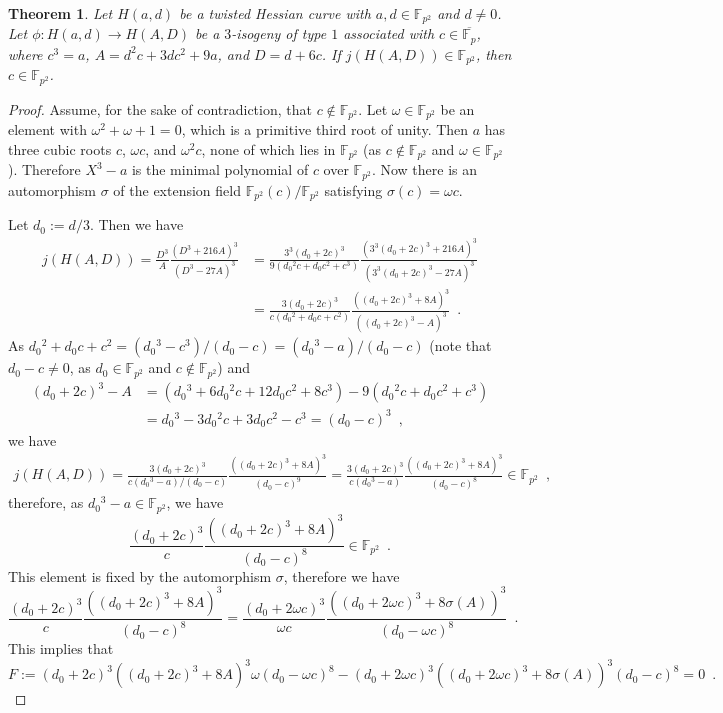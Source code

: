 \documentclass{article}
\newtheorem{theorem}{Theorem}[section]
\theoremstyle{definition}
\newcommand{\FF}{\mathbb{F}}
\begin{document}
\begin{theorem}
\label{thm:whether_codomain_is_over_Fp2}
Let $H(a,d)$ be a twisted Hessian curve with $a,d \in \FF_{p^2}$ and $d \neq 0$.
Let $\phi \colon H(a,d) \to H(A,D)$ be a $3$-isogeny of type $1$ associated with $c \in \overline{\FF_p}$, where $c^3 = a$, $A = d^2 c + 3 d c^2 + 9a$, and $D = d + 6c$.
If $j(H(A,D)) \in \FF_{p^2}$, then $c \in \FF_{p^2}$.
\end{theorem}
\begin{proof}
Assume, for the sake of contradiction, that $c \not\in \FF_{p^2}$.
Let $\omega \in \FF_{p^2}$ be an element with $\omega^2 + \omega + 1 = 0$, which is a primitive third root of unity.
Then $a$ has three cubic roots $c$, $\omega c$, and $\omega^2 c$, none of which lies in $\FF_{p^2}$ (as $c \not\in \FF_{p^2}$ and $\omega \in \FF_{p^2}$).
Therefore $X^3 - a$ is the minimal polynomial of $c$ over $\FF_{p^2}$.
Now there is an automorphism $\sigma$ of the extension field $\FF_{p^2}(c)/\FF_{p^2}$ satisfying $\sigma(c) = \omega c$.

Let $d_0 := d/3$.
Then we have
\[
\begin{split}
j(H(A,D))
= \frac{ D^3 }{ A } \frac{ (D^3 + 216A)^3 }{ (D^3 - 27A)^3 }
&= \frac{ 3^3 (d_0 + 2c)^3 }{ 9 (d_0{}^2 c + d_0 c^2 + c^3) } \frac{ ( 3^3 (d_0 + 2c)^3 + 216 A )^3 }{ ( 3^3 (d_0 + 2c)^3 - 27 A )^3 } \\
&= \frac{ 3 (d_0 + 2c)^3 }{ c (d_0{}^2 + d_0 c + c^2) } \frac{ ( (d_0 + 2c)^3 + 8 A )^3 }{ ( (d_0 + 2c)^3 - A )^3 } \enspace.
\end{split}
\]
As $d_0{}^2 + d_0 c + c^2 = (d_0{}^3 - c^3) / (d_0 - c) = (d_0{}^3 - a) / (d_0 - c)$ (note that $d_0 - c \neq 0$, as $d_0 \in \FF_{p^2}$ and $c \not\in \FF_{p^2}$) and
\[
\begin{split}
(d_0 + 2c)^3 - A
&= (d_0{}^3 + 6 d_0{}^2 c + 12 d_0 c^2 + 8 c^3) - 9 (d_0{}^2 c + d_0 c^2 + c^3) \\
&= d_0{}^3 - 3 d_0{}^2 c + 3 d_0 c^2 - c^3
= (d_0 - c)^3 \enspace,
\end{split}
\]
we have
\[
\begin{split}
j(H(A,D))
= \frac{ 3 (d_0 + 2c)^3 }{ c (d_0{}^3 - a) / (d_0 - c) } \frac{ ( (d_0 + 2c)^3 + 8 A )^3 }{ (d_0 - c)^9 }
= \frac{ 3 (d_0 + 2c)^3 }{ c (d_0{}^3 - a) } \frac{ ( (d_0 + 2c)^3 + 8 A )^3 }{ (d_0 - c)^8 }
\in \FF_{p^2} \enspace,
\end{split}
\]
therefore, as $d_0{}^3 - a \in \FF_{p^2}$, we have
\[
\frac{ (d_0 + 2c)^3 }{ c } \frac{ ( (d_0 + 2c)^3 + 8 A )^3 }{ (d_0 - c)^8 }
\in \FF_{p^2} \enspace.
\]
This element is fixed by the automorphism $\sigma$, therefore we have
\[
\frac{ (d_0 + 2c)^3 }{ c } \frac{ ( (d_0 + 2c)^3 + 8 A )^3 }{ (d_0 - c)^8 }
= \frac{ (d_0 + 2 \omega c)^3 }{ \omega c } \frac{ ( (d_0 + 2 \omega c)^3 + 8 \sigma(A) )^3 }{ (d_0 - \omega c)^8 } \enspace.
\]
This implies that
\[
F
:= (d_0 + 2c)^3 ( (d_0 + 2c)^3 + 8 A )^3 \omega (d_0 - \omega c)^8
- (d_0 + 2 \omega c)^3 ( (d_0 + 2 \omega c)^3 + 8 \sigma(A) )^3 (d_0 - c)^8
= 0 \enspace.
\]


\end{proof}
\end{document}
